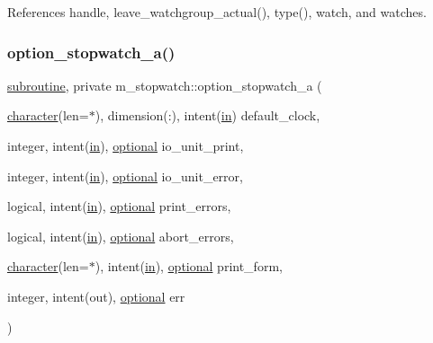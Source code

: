 References handle, leave\+\_\+watchgroup\+\_\+actual(), type(), watch, and watches.

\mbox{\label{namespacem__stopwatch_a01b27391a14a126d017fdacb139d92ca}} 
\subsubsection{\texorpdfstring{option\+\_\+stopwatch\+\_\+a()}{option\_stopwatch\_a()}}
{\footnotesize\ttfamily \hyperlink{M__stopwatch_83_8txt_acfbcff50169d691ff02d4a123ed70482}{subroutine}, private m\+\_\+stopwatch\+::option\+\_\+stopwatch\+\_\+a (\begin{DoxyParamCaption}\item[{\hyperlink{option__stopwatch_83_8txt_abd4b21fbbd175834027b5224bfe97e66}{character}(len=$\ast$), dimension(\+:), intent(\hyperlink{M__journal_83_8txt_afce72651d1eed785a2132bee863b2f38}{in})}]{default\+\_\+clock,  }\item[{integer, intent(\hyperlink{M__journal_83_8txt_afce72651d1eed785a2132bee863b2f38}{in}), \hyperlink{option__stopwatch_83_8txt_aa4ece75e7acf58a4843f70fe18c3ade5}{optional}}]{io\+\_\+unit\+\_\+print,  }\item[{integer, intent(\hyperlink{M__journal_83_8txt_afce72651d1eed785a2132bee863b2f38}{in}), \hyperlink{option__stopwatch_83_8txt_aa4ece75e7acf58a4843f70fe18c3ade5}{optional}}]{io\+\_\+unit\+\_\+error,  }\item[{logical, intent(\hyperlink{M__journal_83_8txt_afce72651d1eed785a2132bee863b2f38}{in}), \hyperlink{option__stopwatch_83_8txt_aa4ece75e7acf58a4843f70fe18c3ade5}{optional}}]{print\+\_\+errors,  }\item[{logical, intent(\hyperlink{M__journal_83_8txt_afce72651d1eed785a2132bee863b2f38}{in}), \hyperlink{option__stopwatch_83_8txt_aa4ece75e7acf58a4843f70fe18c3ade5}{optional}}]{abort\+\_\+errors,  }\item[{\hyperlink{option__stopwatch_83_8txt_abd4b21fbbd175834027b5224bfe97e66}{character}(len=$\ast$), intent(\hyperlink{M__journal_83_8txt_afce72651d1eed785a2132bee863b2f38}{in}), \hyperlink{option__stopwatch_83_8txt_aa4ece75e7acf58a4843f70fe18c3ade5}{optional}}]{print\+\_\+form,  }\item[{integer, intent(out), \hyperlink{option__stopwatch_83_8txt_aa4ece75e7acf58a4843f70fe18c3ade5}{optional}}]{err }\end{DoxyParamCaption})\hspace{0.3cm}{\ttfamily [private]}}



